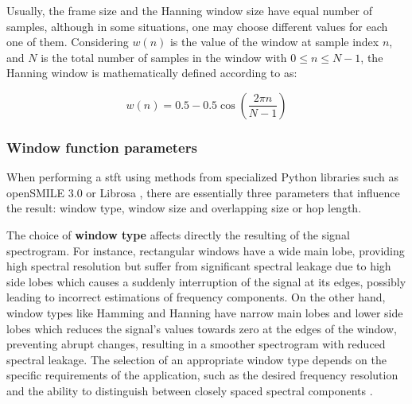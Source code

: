 Usually, the frame size and the Hanning window size have equal number of samples, although in some situations, one may choose different values for each one of them. Considering $w(n)$ is the value of the window at sample index $n$, and $N$ is the total number of samples in the window with $0 \leq n \leq N-1$, the Hanning window is mathematically defined according to \textcite{Smith2013} as:

\begin{equation}
    \label{eq:frmwk_windows_stft}
    w(n) = 0.5 - 0.5 \cos\left(\frac{2 \pi n}{N-1}\right)
\end{equation}


\subsubsection{Window function parameters}
\label{subsubsec:audio_fundamentals_window_function_parameters}

When performing a \gls{stft} using methods from specialized Python libraries such as openSMILE 3.0 \cite{Eyben2010} or  Librosa \cite{McFee2015librosa_conf}, there are essentially three parameters that influence the result: window type, window size and overlapping size or hop length.

The choice of \textbf{window type} affects directly the resulting of the signal spectrogram. For instance, rectangular windows have a wide main lobe, providing high spectral resolution but suffer from significant spectral leakage due to high side lobes which causes a suddenly interruption of the signal at its edges, possibly leading to incorrect estimations of frequency components. On the other hand, window types like Hamming and Hanning have narrow main lobes and lower side lobes which reduces the signal's values towards zero at the edges of the window, preventing abrupt changes, resulting in a smoother spectrogram with reduced spectral leakage. The selection of an appropriate window type depends on the specific requirements of the application, such as the desired frequency resolution and the ability to distinguish between closely spaced spectral components \cite{Zoelzer2008}.

